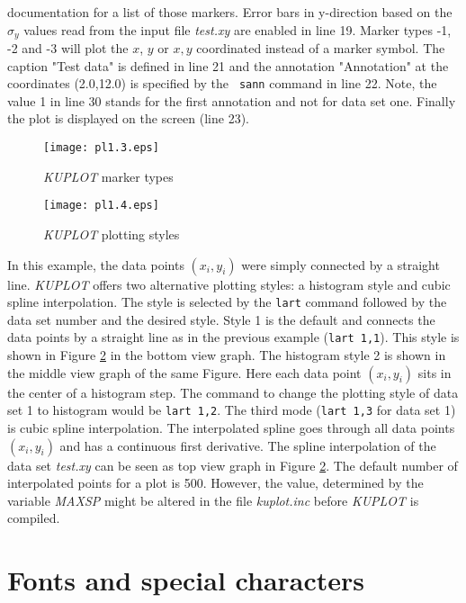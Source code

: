 documentation for a list of those markers. Error bars in y-direction
based on the $\sigma_{y}$ values read from the input file {\it
test.xy} are enabled in line 19. Marker types -1, -2 and -3 will
plot the $x$, $y$ or $x,y$ coordinated instead of a marker symbol.
The caption "Test data" is defined in line 21 and the annotation
"Annotation" at the coordinates (2.0,12.0) is specified by the {\tt
sann} command in line 22. Note, the value 1 in line 30 stands for
the first annotation and not for data set one. Finally the plot is
displayed on the screen (line 23).
%
\begin{figure}[!tb]
   \centering
   \texttt{[image: pl1.3.eps]}
   \caption{{\it KUPLOT} marker types}
   \label{pl1-fig3}
\end{figure}
%
\begin{figure}[!tb]
   \centering
   \texttt{[image: pl1.4.eps]}
   \caption{{\it KUPLOT} plotting styles}
   \label{pl1-fig4}
\end{figure}
%
In this example, the data points $(x_{i},y_{i})$ were simply
connected by a straight line.  {\it KUPLOT} offers two alternative
plotting styles: a histogram style and cubic spline interpolation.
The style is selected by the {\tt lart} command followed by the data
set number and the desired style. Style 1 is the default and
connects the data points by a straight line as in the previous
example ({\tt lart 1,1}).  This style is shown in Figure
\ref{pl1-fig4} in the bottom view graph.  The histogram style 2 is
shown in the middle view graph of the same Figure.  Here each data
point $(x_{i},y_{i})$ sits in the center of a histogram step. The
command to change the plotting style of data set 1 to histogram
would be {\tt lart 1,2}. The third mode ({\tt lart 1,3} for data set
1) is cubic spline interpolation. The interpolated spline goes
through all data points $(x_{i},y_{i})$ and has a continuous first
derivative. The spline interpolation of the data set {\it test.xy}
can be seen as top view graph in Figure \ref{pl1-fig4}. The default
number of interpolated points for a plot is 500. However, the value,
determined by the variable {\it MAXSP} might be altered in the file
{\it kuplot.inc} before {\it KUPLOT} is compiled.


\section{Fonts and special characters \label{1d-char}}

